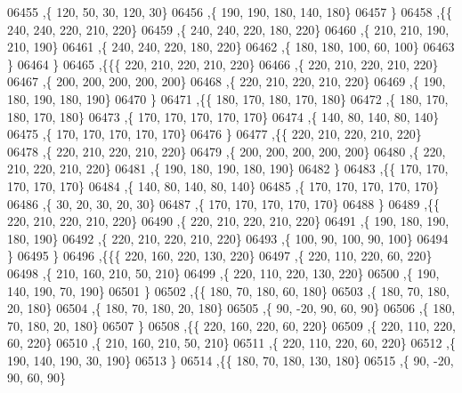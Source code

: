 \begin{DoxyCode}
06455     ,\{   120,    50,    30,   120,    30\}
06456     ,\{   190,   190,   180,   140,   180\}
06457     \}
06458    ,\{\{   240,   240,   220,   210,   220\}
06459     ,\{   240,   240,   220,   180,   220\}
06460     ,\{   210,   210,   190,   210,   190\}
06461     ,\{   240,   240,   220,   180,   220\}
06462     ,\{   180,   180,   100,    60,   100\}
06463     \}
06464    \}
06465   ,\{\{\{   220,   210,   220,   210,   220\}
06466     ,\{   220,   210,   220,   210,   220\}
06467     ,\{   200,   200,   200,   200,   200\}
06468     ,\{   220,   210,   220,   210,   220\}
06469     ,\{   190,   180,   190,   180,   190\}
06470     \}
06471    ,\{\{   180,   170,   180,   170,   180\}
06472     ,\{   180,   170,   180,   170,   180\}
06473     ,\{   170,   170,   170,   170,   170\}
06474     ,\{   140,    80,   140,    80,   140\}
06475     ,\{   170,   170,   170,   170,   170\}
06476     \}
06477    ,\{\{   220,   210,   220,   210,   220\}
06478     ,\{   220,   210,   220,   210,   220\}
06479     ,\{   200,   200,   200,   200,   200\}
06480     ,\{   220,   210,   220,   210,   220\}
06481     ,\{   190,   180,   190,   180,   190\}
06482     \}
06483    ,\{\{   170,   170,   170,   170,   170\}
06484     ,\{   140,    80,   140,    80,   140\}
06485     ,\{   170,   170,   170,   170,   170\}
06486     ,\{    30,    20,    30,    20,    30\}
06487     ,\{   170,   170,   170,   170,   170\}
06488     \}
06489    ,\{\{   220,   210,   220,   210,   220\}
06490     ,\{   220,   210,   220,   210,   220\}
06491     ,\{   190,   180,   190,   180,   190\}
06492     ,\{   220,   210,   220,   210,   220\}
06493     ,\{   100,    90,   100,    90,   100\}
06494     \}
06495    \}
06496   ,\{\{\{   220,   160,   220,   130,   220\}
06497     ,\{   220,   110,   220,    60,   220\}
06498     ,\{   210,   160,   210,    50,   210\}
06499     ,\{   220,   110,   220,   130,   220\}
06500     ,\{   190,   140,   190,    70,   190\}
06501     \}
06502    ,\{\{   180,    70,   180,    60,   180\}
06503     ,\{   180,    70,   180,    20,   180\}
06504     ,\{   180,    70,   180,    20,   180\}
06505     ,\{    90,   -20,    90,    60,    90\}
06506     ,\{   180,    70,   180,    20,   180\}
06507     \}
06508    ,\{\{   220,   160,   220,    60,   220\}
06509     ,\{   220,   110,   220,    60,   220\}
06510     ,\{   210,   160,   210,    50,   210\}
06511     ,\{   220,   110,   220,    60,   220\}
06512     ,\{   190,   140,   190,    30,   190\}
06513     \}
06514    ,\{\{   180,    70,   180,   130,   180\}
06515     ,\{    90,   -20,    90,    60,    90\}

\end{DoxyCode}
